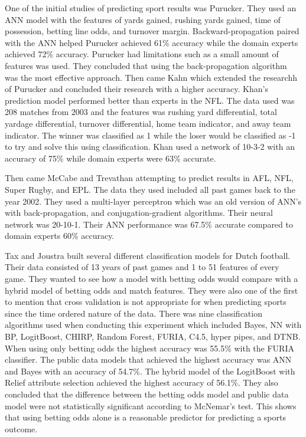 \documentclass[12pt]{IEEEtran}
\begin{document}
One of the initial studies of predicting sport results was Purucker\cite{NNQ}. They used an ANN model with the features of yards gained, rushing yards gained, time of possession, betting line odds, and turnover margin. Backward-propagation paired with the ANN helped Purucker achieved 61\% accuracy while the domain experts achieved 72\% accuracy. Purucker had limitations such as a small amount of features was used. They concluded that using the back-propagation algorithm was the most effective approach. Then came Kahn\cite{kahn2003neural} which extended the researchh of Purucker and concluded their research with a higher accuracy. Khan's prediction model performed better than experts in the NFL. The data used was 208 matches from 2003 and the features was rushing yard differential, total yardage differential, turnover differential, home team indicator, and away team indicator. The winner was classified as 1 while the loser would be classified as -1 to try and solve this using classification. Khan used a network of 10-3-2 with an accuracy of 75\% while domain experts were 63\% accurate. 

Then came McCabe and Trevathan\cite{mccabe2008artificial} attempting to predict results in AFL, NFL, Super Rugby, and EPL. The data they used included all past games back to the year 2002. They used a multi-layer perceptron which was an old version of ANN's with back-propagation, and conjugation-gradient algorithms. Their neural network was 20-10-1. Their ANN performance was 67.5\% accurate compared to domain experts 60\% accuracy. 

Tax and Joustra\cite{tax2015predicting} built several different classification models for Dutch football. Their data consisted of 13 years of past games and 1 to 51 features of every game. They wanted to see how a model with betting odds would compare with a hybrid model of betting odds and match features. They were also one of the first to mention that cross validation is not appropriate for when predicting sports since the time ordered nature of the data. There was nine classification algorithms used when conducting this experiment which included Bayes, NN with BP, LogitBoost, CHIRP, Random Forest, FURIA, C4.5, hyper pipes, and DTNB. When using only betting odds the highest accuracy was 55.5\% with the FURIA classifier. The public data models that achieved the highest accuracy was ANN and Bayes with an accuracy of 54.7\%. The hybrid model of the LogitBoost with Relief attribute selection achieved the highest accuracy of 56.1\%. They also concluded that the difference between the betting odds model and public data model were not statistically significant according to McNemar's test. This shows that using betting odds alone is a reasonable predictor for predicting a sports outcome.  
\end{document}
